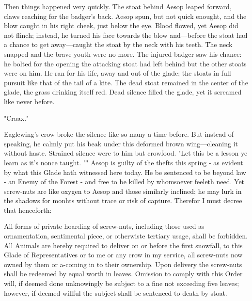 Then things happened very quickly. The stoat behind Aesop leaped forward, claws reaching for the badger's back. Aesop spun, but not quick enought, and the blow caught in his right cheek, just below the eye. Blood flowed, yet Aesop did not flinch; instead, he turned his face towards the blow and—before the stoat had a chance to get away—caught the stoat by the neck with his teeth. The neck snapped and the brave youth were no more. The injured badger saw his chance: he bolted for the opening the attacking stoat had left behind but the other stoats were on him. He ran for his life, away and out of the glade; the stoats in full pursuit like that of the tail of a kite.
  The dead stoat remained in the center of the glade, the grass drinking itself red. Dead silence filled the glade, yet it screamed like never before.%

"Craax."

Eaglewing's crow broke the silence like so many a time before. But instead of speaking, he calmly put his beak under this deformed brown wing—cleaning it without haste. Strained silence were to him but crowfood. "Let this be a lesson ye learn as it's nonce taught. ""
Aesop is guilty of the thefts this spring - as evident by what this Glade hath witnessed here today. He be sentenced to be beyond law - an Enemy of the Forest - and free to be killed by whomsoever feeleth need. Yet screw-nuts are like oxygen to Aesop and those similarly inclined; he may lurk in the shadows for monhts without trace or risk of capture. Therefor I must decree that henceforth: 

	All forms of private hoarding of screw-nuts, including those used as ornamentation, sentimental piece, or otherwiste tertiary usage, shall be forbidden. All Animals are hereby required to deliver on or before the first snowfall, to this Glade of Representatives or to me or any crow in my service, all screw-nuts now owned by them or a-coming in to their ownership. Upon delivery the screw-nuts shall be redeemed by equal worth in leaves. Omission to comply with this Order will, if deemed done unknowingly be subject to a fine not exceeding five leaves; however, if deemed willful the subject shall be sentenced to death by stoat.


